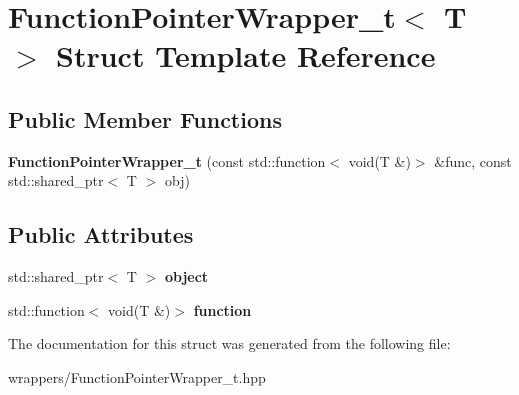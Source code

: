 \hypertarget{struct_function_pointer_wrapper__t}{}\section{Function\+Pointer\+Wrapper\+\_\+t$<$ T $>$ Struct Template Reference}
\label{struct_function_pointer_wrapper__t}
\subsection*{Public Member Functions}
\begin{DoxyCompactItemize}
\item 
\mbox{\label{struct_function_pointer_wrapper__t_a0e732b147c9ee3ff00bd0f503d5870a3}} 
{\bfseries Function\+Pointer\+Wrapper\+\_\+t} (const std\+::function$<$ void(T \&)$>$ \&func, const std\+::shared\+\_\+ptr$<$ T $>$ obj)
\end{DoxyCompactItemize}
\subsection*{Public Attributes}
\begin{DoxyCompactItemize}
\item 
\mbox{\label{struct_function_pointer_wrapper__t_a6eb0757f8336cf880388a841c72f00ff}} 
std\+::shared\+\_\+ptr$<$ T $>$ {\bfseries object}
\item 
\mbox{\label{struct_function_pointer_wrapper__t_a80fef3fe437029b6316f6aa4edae5b49}} 
std\+::function$<$ void(T \&)$>$ {\bfseries function}
\end{DoxyCompactItemize}


The documentation for this struct was generated from the following file\+:\begin{DoxyCompactItemize}
\item 
wrappers/Function\+Pointer\+Wrapper\+\_\+t.\+hpp\end{DoxyCompactItemize}
